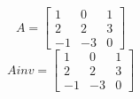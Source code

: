 \[
A=\left[
\begin{array}{ccc}
1 & 0 & 1 \\
2 & 2 & 3\\
-1 & -3 & 0
\end{array}\right]
\]
\[
Ainv=\left[
\begin{array}{ccc}
1 & 0 & 1 \\
2 & 2 & 3\\
-1 & -3 & 0
\end{array}\right]
\]
